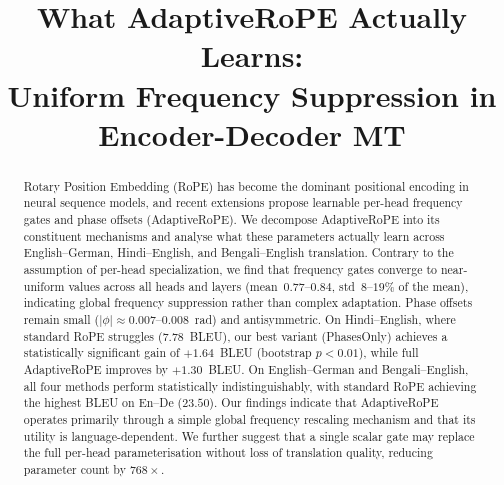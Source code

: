 \documentclass[conference]{IEEEtran}
\begin{document}
\title{What AdaptiveRoPE Actually Learns: \\ Uniform Frequency Suppression in Encoder-Decoder MT}

\author{
  \and
}

\maketitle

\begin{abstract}
Rotary Position Embedding (RoPE) has become the dominant positional encoding
in neural sequence models, and recent extensions propose learnable per-head
frequency gates and phase offsets (AdaptiveRoPE). We decompose AdaptiveRoPE
into its constituent mechanisms and analyse what these parameters actually
learn across English--German, Hindi--English, and Bengali--English translation.
Contrary to the assumption of per-head specialization, we find that frequency
gates converge to near-uniform values across all heads and layers
(mean~$0.77$--$0.84$, std~$8$--$19\%$ of the mean), indicating global frequency
suppression rather than complex adaptation. Phase offsets remain small
($|\phi| \approx 0.007$--$0.008$~rad) and antisymmetric.
On Hindi--English, where standard RoPE struggles ($7.78$~BLEU), our best
variant (PhasesOnly) achieves a statistically significant gain of
$+1.64$~BLEU (bootstrap $p<0.01$), while full AdaptiveRoPE improves by
$+1.30$~BLEU. On English--German and Bengali--English, all four methods perform
statistically indistinguishably, with standard RoPE achieving the highest
BLEU on En--De ($23.50$). Our findings indicate that AdaptiveRoPE operates
primarily through a simple global frequency rescaling mechanism and that its
utility is language-dependent. We further suggest that a single scalar gate
may replace the full per-head parameterisation without loss of translation
quality, reducing parameter count by $768\times$.
\end{abstract}
\end{document}
